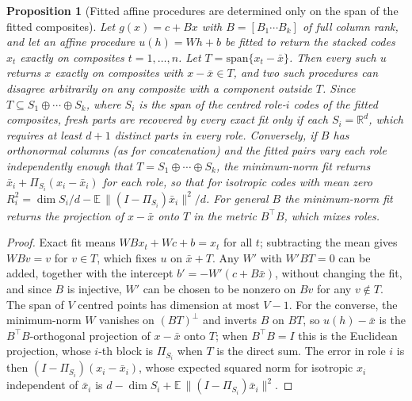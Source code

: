 \documentclass[10pt]{article}
\theoremstyle{plain}
\newtheorem{proposition}{Proposition}
\theoremstyle{remark}
\newcommand{\R}{\mathbb{R}}
\begin{document}
\begin{proposition}[Fitted affine procedures are determined only on the span of the fitted composites]
\label{prop:span}
Let $g(x) = c + Bx$ with $B = [B_1 \cdots B_k]$ of full column rank, and let an affine procedure $u(h) = Wh + b$ be fitted to return the stacked codes $x_t$ exactly on composites $t = 1, \ldots, n$. Let $T = \mathrm{span}\{x_t - \bar{x}\}$. Then every such $u$ returns $x$ exactly on composites with $x - \bar{x} \in T$, and two such procedures can disagree arbitrarily on any composite with a component outside $T$. Since $T \subseteq S_1 \oplus \cdots \oplus S_k$, where $S_i$ is the span of the centred role-$i$ codes of the fitted composites, fresh parts are recovered by every exact fit only if each $S_i = \R^d$, which requires at least $d + 1$ distinct parts in every role. Conversely, if $B$ has orthonormal columns (as for concatenation) and the fitted pairs vary each role independently enough that $T = S_1 \oplus \cdots \oplus S_k$, the minimum-norm fit returns $\bar{x}_i + \Pi_{S_i}(x_i - \bar{x}_i)$ for each role, so that for isotropic codes with mean zero $R^2_i = \dim S_i/d - \mathbb{E}\,\lVert (I - \Pi_{S_i})\bar{x}_i \rVert^2/d$. For general $B$ the minimum-norm fit returns the projection of $x - \bar{x}$ onto $T$ in the metric $B^{\top}B$, which mixes roles.
\end{proposition}

\begin{proof}
Exact fit means $WBx_t + Wc + b = x_t$ for all $t$; subtracting the mean gives $WBv = v$ for $v \in T$, which fixes $u$ on $\bar{x} + T$. Any $W'$ with $W'BT = 0$ can be added, together with the intercept $b' = -W'(c + B\bar{x})$, without changing the fit, and since $B$ is injective, $W'$ can be chosen to be nonzero on $B v$ for any $v \notin T$. The span of $V$ centred points has dimension at most $V - 1$. For the converse, the minimum-norm $W$ vanishes on $(BT)^{\perp}$ and inverts $B$ on $BT$, so $u(h) - \bar{x}$ is the $B^{\top}B$-orthogonal projection of $x - \bar{x}$ onto $T$; when $B^{\top}B = I$ this is the Euclidean projection, whose $i$-th block is $\Pi_{S_i}$ when $T$ is the direct sum. The error in role $i$ is then $(I - \Pi_{S_i})(x_i - \bar{x}_i)$, whose expected squared norm for isotropic $x_i$ independent of $\bar{x}_i$ is $d - \dim S_i + \mathbb{E}\,\lVert (I - \Pi_{S_i})\bar{x}_i \rVert^2$.
\end{proof}
\end{document}
